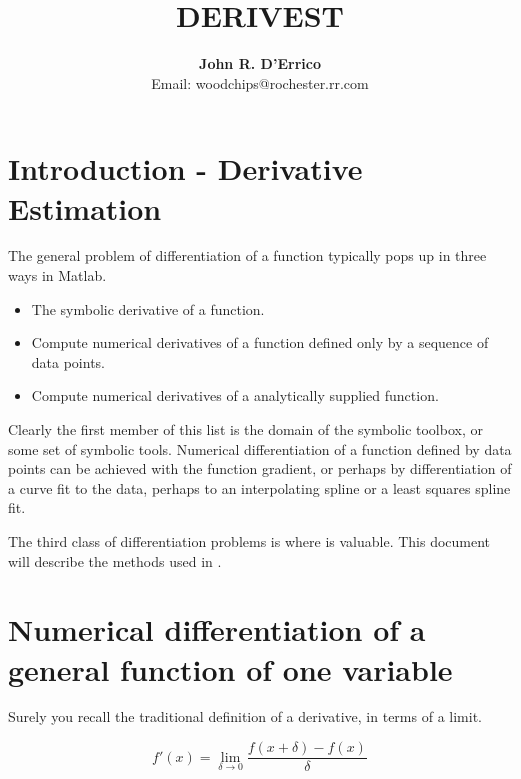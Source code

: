 \documentclass[a4paper,11pt]{article}
\begin{document}

\title{\textsc{DERIVEST}}

\author{\textbf{John R. D'Errico}\\
Email: woodchips@rochester.rr.com}

\maketitle

\section{Introduction - Derivative Estimation}

The general problem of differentiation of a function typically pops up in
three ways in Matlab.

\begin{itemize}
  \item The symbolic derivative of a function.
  \item Compute numerical derivatives of a function defined only by a sequence of data points.
  \item Compute numerical derivatives of a analytically supplied function.
\end{itemize}

Clearly the first member of this list is the domain of the symbolic toolbox, or some
set of symbolic tools. Numerical differentiation of a function defined by data points
can be achieved with the function gradient, or perhaps by differentiation of a curve fit
to the data, perhaps to an interpolating spline or a least squares spline fit.

The third class of differentiation problems is where  is valuable. This
document will describe the methods used in .

\bigskip

\section{Numerical differentiation of a general function of one variable}

Surely you recall the traditional definition of a derivative, in terms of a limit.

\begin{equation} \tag{1}
   f'(x) = \lim_{\delta \to 0}{\frac{f(x+\delta) - f(x)}{\delta}}
\end{equation}
\end{document}
